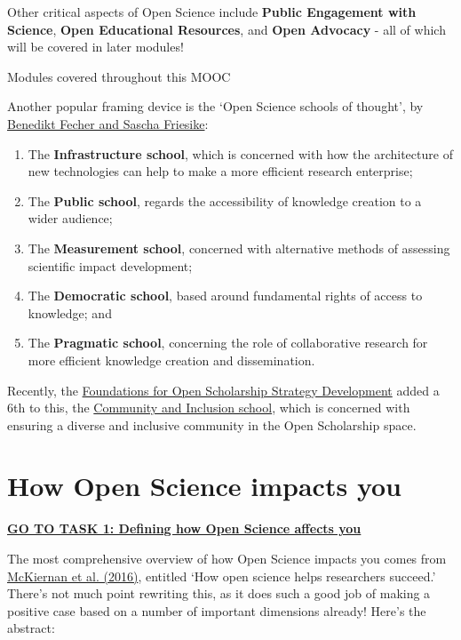 \documentclass[]{book}
\begin{document}
Other critical aspects of Open Science include \textbf{Public Engagement with Science}, \textbf{Open Educational Resources}, and \textbf{Open Advocacy} - all of which will be covered in later modules!

Modules covered throughout this MOOC

Another popular framing device is the `Open Science schools of thought', by \href{https://github.com/OpenScienceMOOC/Module-1-Open-Principles/blob/master/Reading\%20Material_Open\%20Principles/Fecher\%20and\%20Friesike\%2C\%202014.pdf}{Benedikt Fecher and Sascha Friesike}:

\begin{enumerate}
\def\labelenumi{\arabic{enumi}.}
\item
  The \textbf{Infrastructure school}, which is concerned with how the architecture of new technologies can help to make a more efficient research enterprise;
\item
  The \textbf{Public school}, regards the accessibility of knowledge creation to a wider audience;
\item
  The \textbf{Measurement school}, concerned with alternative methods of assessing scientific impact development;
\item
  The \textbf{Democratic school}, based around fundamental rights of access to knowledge; and
\item
  The \textbf{Pragmatic school}, concerning the role of collaborative research for more efficient knowledge creation and dissemination.
\end{enumerate}

Recently, the \href{https://zenodo.org/record/1323437\#.W2bIJSj7RPY}{Foundations for Open Scholarship Strategy Development} added a 6th to this, the \href{https://open-scholarship-strategy.github.io/site/\#Community}{Community and Inclusion school}, which is concerned with ensuring a diverse and inclusive community in the Open Scholarship space.

\hypertarget{how-open-science-impacts-you}{%
\section{How Open Science impacts you }\label{how-open-science-impacts-you}}

\href{Task_1.md}{\textbf{GO TO TASK 1: Defining how Open Science affects you}}

The most comprehensive overview of how Open Science impacts you comes from \href{https://elifesciences.org/articles/16800}{McKiernan et al. (2016)}, entitled `How open science helps researchers succeed.' There's not much point rewriting this, as it does such a good job of making a positive case based on a number of important dimensions already! Here's the abstract:
\end{document}
